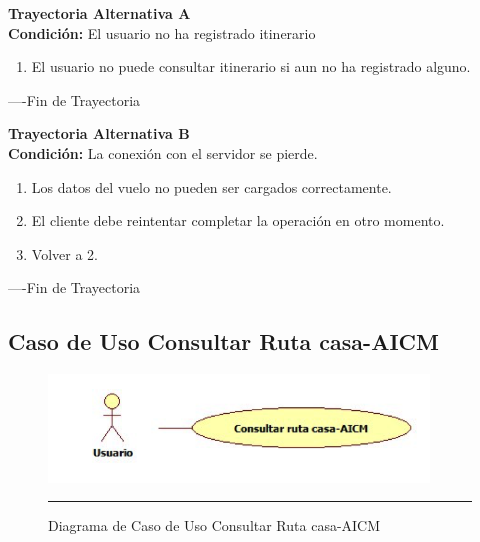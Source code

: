 \begin{flushleft}
	\hypertarget{TrayectoriaA_CU-U-07}{}
	\textbf{Trayectoria Alternativa A}\\
	\textbf{Condición:} El usuario no ha registrado itinerario\\
	\begin{enumerate}
		\item El usuario no puede consultar itinerario si aun no ha registrado alguno.
	\end{enumerate}
\end{flushleft}
----Fin de Trayectoria

\begin{flushleft}
	\hypertarget{TrayectoriaB_CU-U-07}{}
	\textbf{Trayectoria Alternativa B}\\
	\textbf{Condición:} La conexión con el servidor se pierde. \\
	\begin{enumerate}
		\item Los datos del vuelo no pueden ser cargados correctamente. 
		\item El cliente debe reintentar completar la operación en otro momento. 
		\item Volver a 2. 
	\end{enumerate}
\end{flushleft}
----Fin de Trayectoria
\clearpage

\subsection{Caso de Uso Consultar Ruta casa-AICM}

\begin{figure}[htbp]
	\centering
		\includegraphics[width=0.9\textwidth]{Figuras/cuConsultarRutacasa-AICM.png}
		\rule{30em}{0.5pt}
	\caption[Diagrama de Caso de Uso Consultar Ruta casa-AICM]{Diagrama de Caso de Uso Consultar Ruta casa-AICM}
	\label{fig:cuConsultarRutacasa-AICM}
\end{figure}

